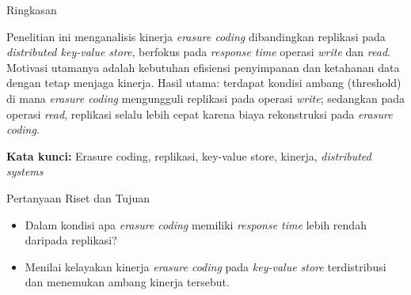 \documentclass[a2,portrait]{config/poster/a0poster}
\newcommand{\postersection}[1]{%
	\begin{tcolorbox}[
		colback=MainBlue,
		colframe=MainBlue,
		fonttitle=\bfseries,
		coltext=white,
		sharp corners,
		boxrule=0pt,
		top=0pt,
		bottom=0pt,
		halign=center
	]
	\normalsize #1
	\end{tcolorbox}%
}
\begin{document}
\begin{multicols}{2} %
\normalsize %

\newcommand{\onecolimg}[2]{%
	\begin{center}
		\parbox{\columnwidth}{%
			\centering
			\texttt{[image: \#1]}
			\captionof{figure}{#2}
		}
	\end{center}
}


\postersection{Ringkasan}
\noindent Penelitian ini menganalisis kinerja \textit{erasure coding} dibandingkan replikasi pada \textit{distributed key-value store}, berfokus pada \textit{response time} operasi \textit{write} dan \textit{read}. Motivasi utamanya adalah kebutuhan efisiensi penyimpanan dan ketahanan data dengan tetap menjaga kinerja. Hasil utama: terdapat kondisi ambang (threshold) di mana \textit{erasure coding} mengungguli replikasi pada operasi \textit{write}; sedangkan pada operasi \textit{read}, replikasi selalu lebih cepat karena biaya rekonstruksi pada \textit{erasure coding}.
\newline
\vspace*{-0.5cm}

\noindent \textbf{Kata kunci:} Erasure coding, replikasi, key-value store, kinerja, \textit{distributed systems}


\postersection{Pertanyaan Riset dan Tujuan}
\begin{itemize}
	\item Dalam kondisi apa \textit{erasure coding} memiliki \textit{response time} lebih rendah daripada replikasi?
\end{itemize}
\begin{itemize}
	\item Menilai kelayakan kinerja \textit{erasure coding} pada \textit{key-value store} terdistribusi dan menemukan ambang kinerja tersebut.
\end{itemize}


\end{multicols}
\end{document}
